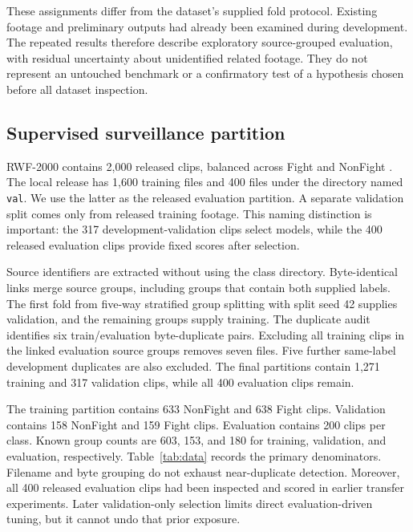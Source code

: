 These assignments differ from the dataset's supplied fold protocol. Existing footage and preliminary outputs had already been examined during development. The repeated results therefore describe exploratory source-grouped evaluation, with residual uncertainty about unidentified related footage. They do not represent an untouched benchmark or a confirmatory test of a hypothesis chosen before all dataset inspection.

\subsection{Supervised surveillance partition}
RWF-2000 contains 2,000 released clips, balanced across Fight and NonFight \cite{cheng2020}. The local release has 1,600 training files and 400 files under the directory named \texttt{val}. We use the latter as the released evaluation partition. A separate validation split comes only from released training footage. This naming distinction is important: the 317 development-validation clips select models, while the 400 released evaluation clips provide fixed scores after selection.

Source identifiers are extracted without using the class directory. Byte-identical links merge source groups, including groups that contain both supplied labels. The first fold from five-way stratified group splitting with split seed 42 supplies validation, and the remaining groups supply training. The duplicate audit identifies six train/evaluation byte-duplicate pairs. Excluding all training clips in the linked evaluation source groups removes seven files. Five further same-label development duplicates are also excluded. The final partitions contain 1,271 training and 317 validation clips, while all 400 evaluation clips remain.

The training partition contains 633 NonFight and 638 Fight clips. Validation contains 158 NonFight and 159 Fight clips. Evaluation contains 200 clips per class. Known group counts are 603, 153, and 180 for training, validation, and evaluation, respectively. Table~\ref{tab:data} records the primary denominators. Filename and byte grouping do not exhaust near-duplicate detection. Moreover, all 400 released evaluation clips had been inspected and scored in earlier transfer experiments. Later validation-only selection limits direct evaluation-driven tuning, but it cannot undo that prior exposure.

